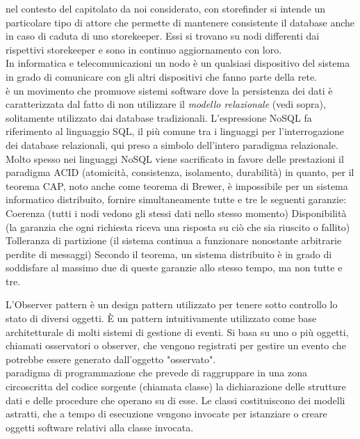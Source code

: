 \documentclass{scalatekids-article}
\begin{document}

   nel contesto del capitolato da noi considerato, con storefinder si intende un particolare tipo di attore che permette di mantenere consistente il database anche in caso di caduta di uno storekeeper. Essi si trovano su nodi differenti dai rispettivi storekeeper e sono in continuo aggiornamento con loro.
  \\

   In informatica e telecomunicazioni un nodo è un qualsiasi dispositivo del sistema in grado di comunicare con gli altri dispositivi che fanno parte della rete.
  \\

   è un movimento che promuove sistemi software dove la persistenza dei dati è caratterizzata dal fatto di non utilizzare il \textit{modello relazionale} (vedi sopra), solitamente utilizzato dai database tradizionali.
  L'espressione NoSQL fa riferimento al linguaggio SQL, il più comune tra i linguaggi per l'interrogazione dei database relazionali, qui preso a simbolo dell'intero paradigma relazionale. Molto spesso nei linguaggi NoSQL viene sacrificato in favore delle prestazioni il paradigma ACID (atomicità, consistenza, isolamento, durabilità) in quanto, per il teorema CAP, noto anche come teorema di Brewer, è impossibile per un sistema informatico distribuito, fornire simultaneamente tutte e tre le seguenti garanzie:
  Coerenza (tutti i nodi vedono gli stessi dati nello stesso momento)
  Disponibilità (la garanzia che ogni richiesta riceva una risposta su ciò che sia riuscito o fallito)
  Tolleranza di partizione (il sistema continua a funzionare nonostante arbitrarie perdite di messaggi)
  Secondo il teorema, un sistema distribuito è in grado di soddisfare al massimo due di queste garanzie allo stesso tempo, ma non tutte e tre.
  \\


   L'Observer pattern è un design pattern utilizzato per tenere sotto controllo lo stato di diversi oggetti.
  È un pattern intuitivamente utilizzato come base architetturale di molti sistemi di gestione di eventi. 
  Si basa su uno o più oggetti, chiamati osservatori o observer, che vengono registrati per gestire un evento che potrebbe essere generato dall'oggetto "osservato".
  \\

   paradigma di programmazione che prevede di raggruppare in una zona circoscritta del codice sorgente (chiamata classe) la dichiarazione delle strutture dati e delle procedure che operano su di esse. Le classi costituiscono dei modelli astratti, che a tempo di esecuzione vengono invocate per istanziare o creare oggetti software relativi alla classe invocata.
  \\
\end{document}
